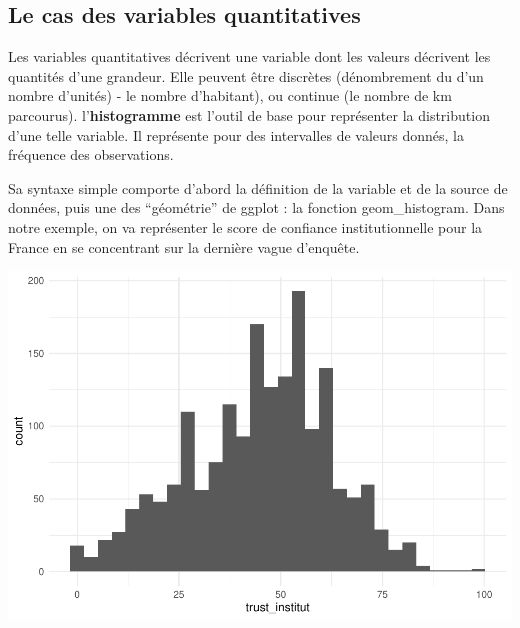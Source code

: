 \documentclass[
]{book}
\newenvironment{Shaded}{\begin{snugshade}}{\end{snugshade}}
\newcommand{\CommentTok}[1]{\textcolor[rgb]{0.56,0.35,0.01}{\textit{#1}}}
\newcommand{\DataTypeTok}[1]{\textcolor[rgb]{0.13,0.29,0.53}{#1}}
\newcommand{\KeywordTok}[1]{\textcolor[rgb]{0.13,0.29,0.53}{\textbf{#1}}}
\newcommand{\NormalTok}[1]{#1}
\newcommand{\OperatorTok}[1]{\textcolor[rgb]{0.81,0.36,0.00}{\textbf{#1}}}
\newcommand{\StringTok}[1]{\textcolor[rgb]{0.31,0.60,0.02}{#1}}
\begin{document}
\hypertarget{le-cas-des-variables-quantitatives}{%
\subsection{Le cas des variables quantitatives}\label{le-cas-des-variables-quantitatives}}

Les variables quantitatives décrivent une variable dont les valeurs décrivent les quantités d'une grandeur. Elle peuvent être discrètes (dénombrement du d'un nombre d'unités) - le nombre d'habitant), ou continue (le nombre de km parcourus). l'\textbf{histogramme} est l'outil de base pour représenter la distribution d'une telle variable. Il représente pour des intervalles de valeurs donnés, la fréquence des observations.

Sa syntaxe simple comporte d'abord la définition de la variable et de la source de données, puis une des ``géométrie'' de ggplot : la fonction geom\_histogram. Dans notre exemple, on va représenter le score de confiance institutionnelle pour la France en se concentrant sur la dernière vague d'enquête.

\begin{Shaded}
\end{Shaded}

\includegraphics{bookdown-demo_files/figure-latex/302-1.pdf}
\end{document}
